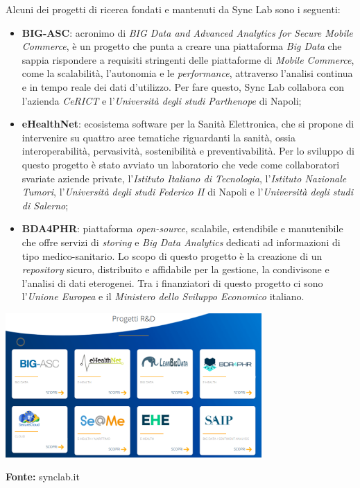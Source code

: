 Alcuni dei progetti di ricerca fondati e mantenuti da Sync Lab sono i seguenti:
\begin{itemize}
  \item \textbf{BIG-ASC}: acronimo di \textit{BIG Data and Advanced Analytics for Secure Mobile Commerce}, è un progetto che punta a creare una piattaforma \textit{Big Data} che sappia rispondere a requisiti stringenti delle piattaforme di \textit{Mobile Commerce}, come la scalabilità, l'autonomia e le \textit{performance}, attraverso l'analisi continua e in tempo reale dei dati d'utilizzo. Per fare questo, Sync Lab collabora con l'azienda \textit{CeRICT} e l'\textit{Università degli studi Parthenope} di Napoli;
  \item \textbf{eHealthNet}: ecosistema software per la Sanità Elettronica, che si propone di intervenire su quattro aree tematiche riguardanti la sanità, ossia interoperabilità, pervasività, sostenibilità e preventivabilità. Per lo sviluppo di questo progetto è stato avviato un laboratorio che vede come collaboratori svariate aziende private, l'\textit{Istituto Italiano di Tecnologia}, l'\textit{Istituto Nazionale Tumori}, l'\textit{Università degli studi Federico II} di Napoli e l'\textit{Università degli studi di Salerno};
  \item \textbf{BDA4PHR}: piattaforma \textit{open-source}, scalabile, estendibile e manutenibile che offre servizi di \textit{storing} e \textit{Big Data Analytics} dedicati ad informazioni di tipo medico-sanitario. Lo scopo di questo progetto è la creazione di un \textit{repository} sicuro, distribuito e affidabile per la gestione, la condivisone e l'analisi di dati eterogenei. Tra i finanziatori di questo progetto ci sono l'\textit{Unione Europea} e il \textit{Ministero dello Sviluppo Economico} italiano. \\
\end{itemize}

\begin{minipage}{\linewidth}
  \centering
    \includegraphics[height=5.5cm]{immagini/progetti}
  \caption*{\textbf{Fonte:} synclab.it}
\end{minipage} \\

